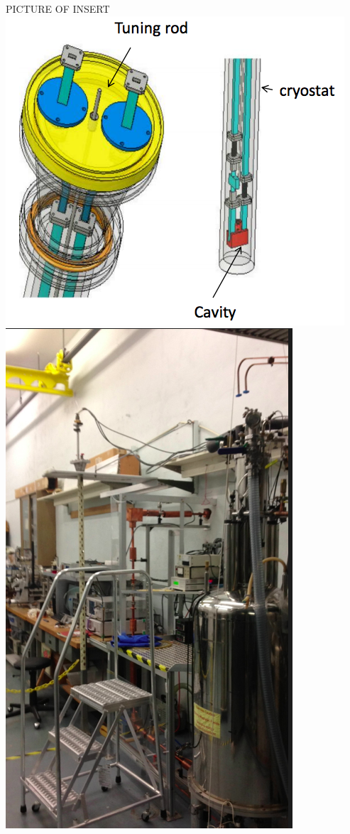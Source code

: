 \documentclass[11pt]{article}
\begin{document}
PICTURE OF INSERT
\includegraphics[width=\textwidth]{insertdrawing}
\includegraphics[width=\textwidth]{experiment}
\end{document}
